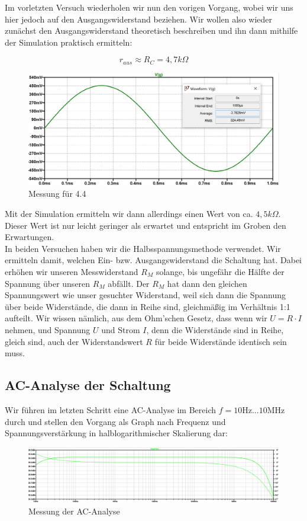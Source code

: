 \documentclass{article}
\begin{document}
Im vorletzten Versuch wiederholen wir nun den vorigen Vorgang, wobei wir uns hier jedoch auf den Ausgangswiderstand beziehen. Wir wollen also wieder zunächst den Ausgangswiderstand theoretisch beschreiben und ihn dann mithilfe der Simulation praktisch ermitteln:

\begin{equation*}
  r_{aus}\approx R_{C} = 4,7k\Omega
\end{equation*}

\begin{figure}[h]
  \centering
  \includegraphics[width=\textwidth]{../assets/images/EL2P1/abb8.png}
  \caption{Messung für 4.4}
  \label{fig:diag44}
\end{figure}
\newpage
Mit der Simulation ermitteln wir dann allerdings einen Wert von ca. $4,5k\Omega$. Dieser Wert ist nur leicht geringer als erwartet und entspricht im Groben den Erwartungen.\\
In beiden Versuchen haben wir die Halbsspannungsmethode verwendet. Wir ermitteln damit, welchen Ein- bzw. Ausgangswiderstand die Schaltung hat. Dabei erhöhen wir unseren Messwiderstand $R_{M}$ solange, bis ungefähr die Hälfte der Spannung über unseren $R_{M}$ abfällt. Der $R_{M}$ hat dann den gleichen Spannungswert wie unser gesuchter Widerstand, weil sich dann die Spannung über beide Widerstände, die dann in Reihe sind, gleichmäßig im Verhältnis 1:1 aufteilt. Wir wissen nämlich, aus dem Ohm'schen Gesetz, dass wenn wir $U = R \cdot I$ nehmen, und Spannung $U$ und Strom $I$, denn die Widerstände sind in Reihe, gleich sind, auch der Widerstandswert $R$ für beide Widerstände identisch sein muss.
\newpage
\subsection{AC-Analyse der Schaltung}

Wir führen im letzten Schritt eine AC-Analyse im Bereich $f=10\mathrm{Hz}...10\mathrm{MHz}$ durch und stellen den Vorgang als Graph nach Frequenz und Spannungsverstärkung in halblogarithmischer Skalierung dar:

\begin{figure}[h]
  \centering
  \includegraphics[width=\textwidth]{../assets/images/EL2P1/abb9.png}
  \caption{Messung der AC-Analyse}
  \label{fig:ac}
\end{figure}


{}
\end{document}
